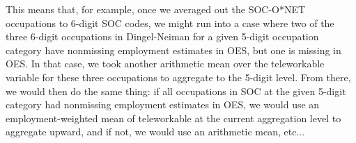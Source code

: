 \documentclass{article}
\begin{document}
This means that, for example, once we averaged out the SOC-O*NET occupations to 6-digit SOC codes, we might run into a case where two of the three 6-digit occupations in Dingel-Neiman for a given 5-digit occupation category have nonmissing employment estimates in OES, but one is missing in OES. In that case, we took another arithmetic mean over the teleworkable variable for these three occupations to aggregate to the 5-digit level. From there, we would then do the same thing: if all occupations in SOC at the given 5-digit category had nonmissing employment estimates in OES, we would use an employment-weighted mean of teleworkable at the current aggregation level to aggregate upward, and if not, we would use an arithmetic mean, etc...




\end{document}
